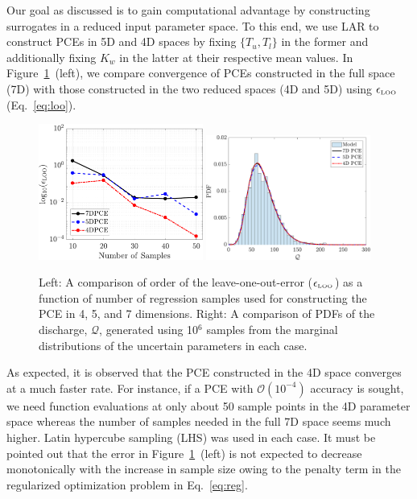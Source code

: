 Our goal as discussed is to gain computational advantage by constructing
surrogates in a reduced input parameter space. To this end, we use LAR to 
construct PCEs
in 5D and 4D spaces by fixing $\{T_u,T_l\}$ in the former and additionally
fixing $K_w$ in the latter at their respective mean values. In
Figure~\ref{fig:conv_bore}~(left), we compare convergence of PCEs constructed in the
full space (7D) with those constructed in the two reduced spaces (4D and 5D)
using $\epsilon_{\mbox{\tiny{LOO}}}$ (Eq.~\ref{eq:loo}). 

\begin{figure}[htbp]
 \begin{center}
  \includegraphics[width=0.48\textwidth]{./Figures/err_samples_borehole}
  \includegraphics[width=0.48\textwidth]{./Figures/pdf_comp_borehole}
\caption{Left: A comparison of order of the leave-one-out-error 
($\epsilon_{\mbox{\tiny{LOO}}}$) as a function of number of regression samples
used for constructing the PCE in 4, 5, and 7 dimensions. Right: A comparison of
PDFs of the discharge, $\mathcal{Q}$, generated using 10$^{6}$ samples from
the marginal distributions of the uncertain parameters in each case.} 
\label{fig:conv_bore}
\end{center}
\end{figure}
%
As expected, it is observed that the PCE constructed in the 4D space converges
at a much faster rate. For instance, if a PCE with $\mathcal{O}(10^{-4})$
accuracy is sought, we need function evaluations at only about 50 sample points
in the 4D parameter space whereas the number of samples needed in the full 7D
space seems much higher. Latin hypercube sampling (LHS) was used in
each case. It must be pointed out that the error in Figure~\ref{fig:conv_bore}~(left)
is not expected to decrease monotonically with the increase in sample size
owing to the penalty term in the regularized optimization problem in Eq.~\ref{eq:reg}. 


